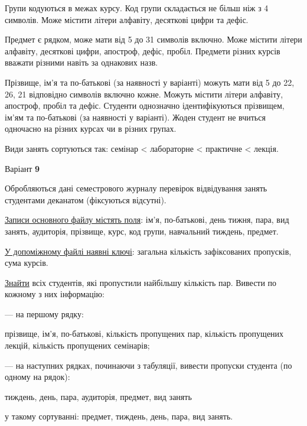 \documentclass[11pt, ukrainian]{article}
\begin{document}
Групи кодуються в межах курсу.
Код групи складається не більш ніж з 4 символів.
Може містити літери алфавіту, десяткові цифри та дефіс.

Предмет є рядком, може мати від 5 до 31 символів включно.
Може містити літери алфавіту, десяткові цифри, апостроф, дефіс, пробіл.
Предмети різних курсів вважати різними навіть за однакових назв.

Прізвище, ім’я та по-батькові (за наявності у варіанті)
можуть мати від 5 до 22, 26, 21 відповідно символів включно кожне.
Можуть містити літери алфавіту, апостроф, пробіл та дефіс.
Студенти однозначно ідентифікуються прізвищем, ім’ям та по-батькові (за наявності у варіанті).
Жоден студент не вчиться одночасно на різних курсах чи в різних групах.

Види занять сортуються так: семінар < лабораторне < практичне < лекція.



\par
\newpage
{\center Варіант  \No \textbf { 9 }\par}
\bigskip
Обробляються дані семестрового журналу перевірок відвідування занять студентами деканатом (фіксуються відсутні). 

\underline{Записи основного файлу містять поля}: ім’я, по-батькові, день тижня, пара, вид занять, аудиторія, прізвище, курс, код групи, навчальний тиждень, предмет.

\underline{У допоміжному файлі наявні ключі}: загальна кількість зафіксованих пропусків, сума курсів.

\underline{Знайти} всіх студентів, які пропустили найбільшу кількість пар. Вивести по кожному з них інформацію:\par
{\noindent}--- на першому рядку:\par
прізвище, ім’я, по-батькові, кількість пропущених пар, кількість пропущених лекцій, кількість пропущених семінарів;

{\noindent}--- на наступних рядках, починаючи з табуляції, вивести пропуски студента (по одному на рядок):\par
тиждень, день, пара, аудиторія, предмет, вид занять

{\noindent}у такому сортуванні: предмет, тиждень, день, пара, вид занять.

\end{document}
